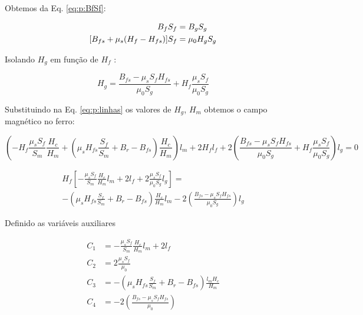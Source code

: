 Obtemos da Eq. \eqref{eq:p:BfSf}:

\begin{align*}
	B_f S_f &= B_g S_g \notag \\
	[B_{fs} + \mu_s (H_f - H_{fs})] S_f &= \mu_0 H_g S_g \notag \\
\end{align*}

Isolando $H_g$ em função de $H_f$ :

\begin{equation}
	H_g = \frac{B_{fs} - \mu_s S_f H_{fs}}{\mu_0 S_g} + H_f \frac{\mu_s S_f}{\mu_0 S_g} \label{eq:p:Hg}
\end{equation}

Substituindo na Eq. \eqref{eq:p:linhas}  os valores de $H_g$, $H_m$ obtemos o campo magnético no ferro:

\[
	 \left(  - H_f \frac{\mu_s S_f}{S_m}\frac{H_c}{H_m} + \left( \mu_s H_{fs} \frac{S_f}{S_m} + B_r - B_{fs}\right) \frac{H_c}{H_m}\right) l_m + 2 H_f l_f + 2 \left( \frac{B_{fs} - \mu_s S_f H_{fs}}{\mu_0 S_g} + H_f \frac{\mu_s S_f}{\mu_0 S_g} \right) l_g = 0
\]

\begin{multline}
	H_f \left[ -\frac{\mu_s S_f }{S_m}\frac{H_c}{H_m} l_m + 2 l_f + 2 \frac{\mu_s S_f}{\mu_0 S_g} l_g\right] = \\
				 -\left( \mu_s H_{fs} \frac{S_f}{S_m} + B_r - B_{fs}\right) \frac{H_c}{H_m} l_m - 2 \left( \frac{B_{fs} - \mu_s S_f H_{fs}}{\mu_0 S_g} \right) l_g
\end{multline}


Definido as variáveis auxiliares

\begin{align}
	C_1 &= -\frac{\mu_s S_f }{S_m}\frac{H_c}{H_m} l_m + 2 l_f \\
	C_2 &= 2 \frac{\mu_s S_f}{\mu_0} \\
	C_3 &= -\left( \mu_s H_{fs} \frac{S_f}{S_m} + B_r - B_{fs}\right)  \frac{l_m H_c}{H_m}\\
	C_4 &= - 2 \left( \frac{B_{fs} - \mu_s S_f H_{fs}}{\mu_0} \right) 
\end{align}



